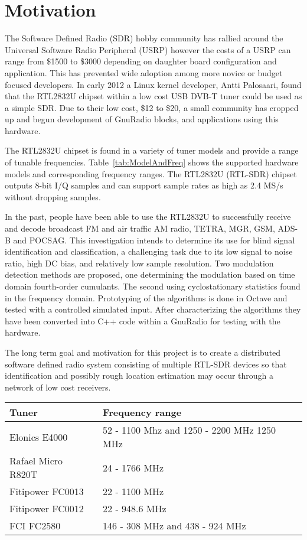\section{Motivation}

The Software Defined Radio (SDR) hobby community has rallied around
the Universal Software Radio Peripheral (USRP) however the costs of a USRP can
range from \$1500 to \$3000 depending on daughter board configuration and
application.  This has prevented wide adoption among more novice or budget
focused developers. In early 2012 a Linux kernel developer, Antti Palosaari,
found that the RTL2832U chipset within a low cost USB DVB-T tuner
could be used as a simple SDR.  Due to their low cost, \$12 to \$20, a
small community has cropped up and begun development of GnuRadio blocks, and
applications using this hardware.

The RTL2832U chipset is found in a variety of tuner models and provide a range
of tunable frequencies.
Table~\ref{tab:ModelAndFreq} shows the supported hardware models and
corresponding frequency ranges.  The RTL2832U (RTL-SDR) chipset outputs 8-bit
I/Q samples and can support sample rates as high as 2.4 MS/s without dropping samples.  

In the past, people have been able to use the RTL2832U to successfully
receive and decode broadcast FM and air traffic AM radio, TETRA, MGR, GSM, ADS-B
and POCSAG.  This investigation intends to determine its use for blind signal
identification and classification, a challenging task due to its low signal to
noise ratio, high DC bias, and relatively low sample resolution.  Two
modulation detection methods are proposed, one determining the modulation
based on time domain fourth-order cumulants.  The second using cyclostationary
statistics found in the frequency domain.  Prototyping of the algorithms
is done in Octave and tested with a controlled simulated input. 
After characterizing the algorithms they have been converted into C++ code
within a GnuRadio for testing with the hardware. 

The long term goal and motivation for this project is to create a
distributed software defined radio system consisting of multiple RTL-SDR
devices so that identification and possibly rough location estimation may occur
through a network of low cost receivers.


\begin{table*}[h]
\centering
\caption{Tuner Model and Frequency Range Supported}
\begin{tabular}{| l | l |} \hline
Tuner	& Frequency range \\ \hline
Elonics E4000	& 52 - 1100 Mhz and 1250 - 2200 MHz 1250 MHz \\ \hline
Rafael Micro R820T &	24 - 1766 MHz \\ \hline
Fitipower FC0013 & 22 - 1100 MHz  \\ \hline
Fitipower FC0012 &	22 - 948.6 MHz \\ \hline
FCI FC2580	& 146 - 308 MHz and 438 - 924 MHz \\ \hline
\end{tabular}
\label{tab:ModelAndFreq}
\end{table*}
